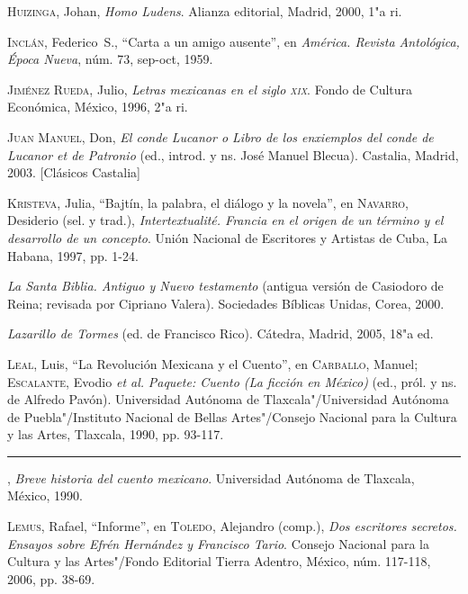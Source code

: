 \documentclass[14pt,twoside,final]{extbook} %
\begin{document}
\textsc{Huizinga}, Johan, \emph{Homo Ludens}. Alianza editorial, Madrid, 2000, 1"a ri.\label{bib:huizinga2000}

\textsc{Inclán}, Federico~S., ``Carta a un amigo ausente'', en \emph{América. Revista Antológica, Época Nueva}, núm. 73, sep-oct, 1959.\label{bib:inclan1959}

\textsc{Jiménez Rueda}, Julio, \emph{Letras mexicanas en el siglo \textsc{xix}}. Fondo de Cultura Económica, México, 1996, 2"a ri.\label{bib:jimenez1996}

\textsc{Juan Manuel}, Don, \emph{El conde Lucanor o Libro de los enxiemplos del conde de Lucanor et de Patronio} (ed., introd. y ns. José Manuel Blecua). Castalia, Madrid, 2003. [Clásicos Castalia]\label{bib:juanmanuel2003}

\textsc{Kristeva}, Julia, ``Bajtín, la palabra, el diálogo y la novela'', en \textsc{Navarro}, Desiderio (sel. y trad.), \emph{Intertextualité. Francia en el origen de un término y el desarrollo de un concepto}. Unión Nacional de Escritores y Artistas de Cuba, La Habana, 1997, pp. 1-24.\label{bib:kristeva1997}

\emph{La Santa Biblia. Antiguo y Nuevo testamento} (antigua versión de Casiodoro de Reina; revisada por Cipriano Valera). Sociedades Bíblicas Unidas, Corea, 2000.\label{bib:biblia2000}

\emph{Lazarillo de Tormes} (ed. de Francisco Rico). Cátedra, Madrid, 2005, 18"a ed.\label{bib:lazarillo2005}

\textsc{Leal}, Luis, ``La Revolución Mexicana y el Cuento'', en \textsc{Carballo}, Manuel; \textsc{Escalante}, Evodio \emph{et al.} \emph{Paquete: Cuento (La ficción en México)} (ed., pról. y ns. de Alfredo Pavón). Universidad Autónoma de Tlaxcala"/Universidad Autónoma de Puebla"/Instituto Nacional de Bellas Artes"/Consejo Nacional para la Cultura y las Artes, Tlaxcala, 1990, pp. 93-117.\label{bib:leal1990a}

\rule{1cm}{0.4pt}, \emph{Breve historia del cuento mexicano}. Universidad Autónoma de Tlaxcala, México, 1990.\label{bib:leal1990b}

\textsc{Lemus}, Rafael, ``Informe'', en \textsc{Toledo}, Alejandro (comp.), \emph{Dos escritores secretos. Ensayos sobre Efrén Hernández y Francisco Tario}. Consejo Nacional para la Cultura y las Artes"/Fondo Editorial Tierra Adentro, México, núm. 117-118, 2006, pp. 38-69.\label{bib:lemus2006}
\end{document}
